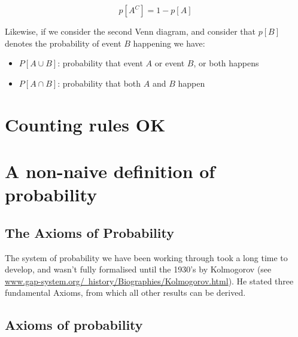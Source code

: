 \documentclass{book}
\begin{document}
\begin{displaymath}
p[A^C] = 1 - p[A]
\end{displaymath}


Likewise, if we consider the second Venn diagram, and consider that $p[B]$ denotes the probability of event $B$ happening we have:

\begin{itemize}
\item $P[A \cup B]$: probability that event $A$ or event $B$, or both happens
\item $P[A \cap B]$: probability that both $A$ and $B$ happen
\end{itemize}



\chapter{Counting rules OK}

\chapter{A non-naive definition of probability}


\section{The Axioms of Probability}

The system of probability we have been working through took a long time to develop, and wasn't fully formalised until the 1930's by Kolmogorov (see 
\href{http://www.gap-system.org/~history/Biographies/Kolmogorov.html}{\color{blue}www.gap-system.org/~history/Biographies/Kolmogorov.html}).   He stated three fundamental Axioms, from which all other results can be derived.


\section{Axioms of probability}

\end{document}
